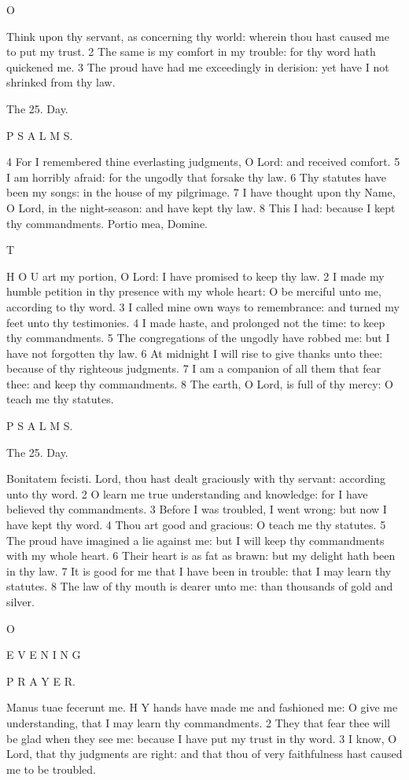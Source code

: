 O

Think upon thy servant, as concerning thy world: wherein thou hast caused me to put my trust. 2 The same is my comfort in my trouble: for thy word hath quickened me. 3 The proud have had me exceedingly in derision: yet have I not shrinked from thy law.

The 25. Day.

P S A L M S.

4 For I remembered thine everlasting judgments, O Lord: and received comfort. 5 I am horribly afraid: for the ungodly that forsake thy law. 6 Thy statutes have been my songs: in the house of my pilgrimage. 7 I have thought upon thy Name, O Lord, in the night-season: and have kept thy law. 8 This I had: because I kept thy commandments. Portio mea, Domine.

T

H O U art my portion, O Lord: I have promised to keep thy law. 2 I made my humble petition in thy presence with my whole heart: O be merciful unto me, according to thy word. 3 I called mine own ways to remembrance: and turned my feet unto thy testimonies. 4 I made haste, and prolonged not the time: to keep thy commandments. 5 The congregations of the ungodly have robbed me: but I have not forgotten thy law. 6 At midnight I will rise to give thanks unto thee: because of thy righteous judgments. 7 I am a companion of all them that fear thee: and keep thy commandments. 8 The earth, O Lord, is full of thy mercy: O teach me thy statutes.

P S A L M S.

The 25. Day.

Bonitatem fecisti. Lord, thou hast dealt graciously with thy servant: according unto thy word. 2 O learn me true understanding and knowledge: for I have believed thy commandments. 3 Before I was troubled, I went wrong: but now I have kept thy word. 4 Thou art good and gracious: O teach me thy statutes. 5 The proud have imagined a lie against me: but I will keep thy commandments with my whole heart. 6 Their heart is as fat as brawn: but my delight hath been in thy law. 7 It is good for me that I have been in trouble: that I may learn thy statutes. 8 The law of thy mouth is dearer unto me: than thousands of gold and silver.

O

E V E N I N G

P R A Y E R.

Manus tuae fecerunt me. H Y hands have made me and fashioned me: O give me understanding, that I may learn thy commandments. 2 They that fear thee will be glad when they see me: because I have put my trust in thy word. 3 I know, O Lord, that thy judgments are right: and that thou of very faithfulness hast caused me to be troubled.

